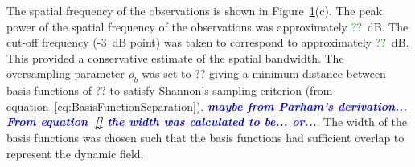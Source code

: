 \documentclass[12pt]{iopart}
\newcommand{\todo}[1]{\textsf{\emph{\textbf{\textcolor{blue}{#1}}}}}
\newcommand{\omg}[1]{\textsf{\emph{\textbf{\textcolor{green}{#1}}}}}
\begin{document}
The spatial frequency of the observations is shown in Figure~\ref{fig:FreqAnalysis}(c). The peak power of the spatial frequency of the observations was approximately \omg{$??$}~dB. The cut-off frequency (-3~dB point) was taken to correspond to  approximately \omg{$??$}~dB. This provided a conservative estimate of the spatial bandwidth. The oversampling parameter $\rho_b$ was set to $??$ giving a minimum distance between basis functions of $??$ to satisfy Shannon's sampling criterion (from equation~\ref{eq:BasisFunctionSeparation}). \todo{maybe from Parham's derivation... From equation~\ref{} the width was calculated to be... or...}. The width of the basis functions was chosen such that the basis functions had sufficient overlap to represent the dynamic field.

\begin{figure}
	\label{fig:FreqAnalysis} 
	\begin{center}
\\

\end{center}
\end{figure}
\end{document}
